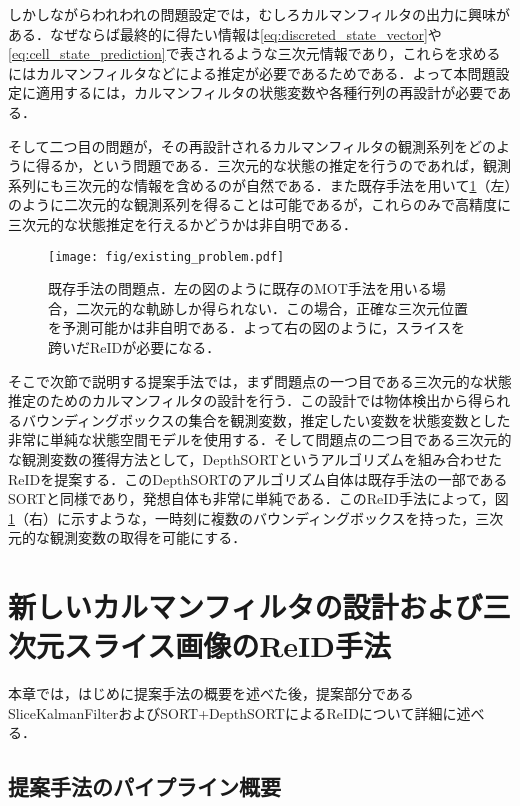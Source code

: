    しかしながらわれわれの問題設定では，むしろカルマンフィルタの出力に興味がある．なぜならば最終的に得たい情報は\ref{eq:discreted_state_vector}や\ref{eq:cell_state_prediction}で表されるような三次元情報であり，これらを求めるにはカルマンフィルタなどによる推定が必要であるためである．よって本問題設定に適用するには，カルマンフィルタの状態変数や各種行列の再設計が必要である．

    そして二つ目の問題が，その再設計されるカルマンフィルタの観測系列をどのように得るか，という問題である．三次元的な状態の推定を行うのであれば，観測系列にも三次元的な情報を含めるのが自然である．また既存手法を用いて\ref{fig:existing_problem}（左）のように二次元的な観測系列を得ることは可能であるが，これらのみで高精度に三次元的な状態推定を行えるかどうかは非自明である．

    \begin{figure}[t]
        \centering
        \texttt{[image: fig/existing\_problem.pdf]}
        \caption[既存手法の問題点]{既存手法の問題点．左の図のように既存のMOT手法を用いる場合，二次元的な軌跡しか得られない．この場合，正確な三次元位置を予測可能かは非自明である．よって右の図のように，スライスを跨いだReIDが必要になる．}
        \label{fig:existing_problem}
    \end{figure}

    そこで次節で説明する提案手法では，まず問題点の一つ目である三次元的な状態推定のためのカルマンフィルタの設計を行う．この設計では物体検出から得られるバウンディングボックスの集合を観測変数，推定したい変数を状態変数とした非常に単純な状態空間モデルを使用する．そして問題点の二つ目である三次元的な観測変数の獲得方法として，DepthSORTというアルゴリズムを組み合わせたReIDを提案する．このDepthSORTのアルゴリズム自体は既存手法の一部であるSORTと同様であり，発想自体も非常に単純である．このReID手法によって，図\ref{fig:existing_problem}（右）に示すような，一時刻に複数のバウンディングボックスを持った，三次元的な観測変数の取得を可能にする．

\section{新しいカルマンフィルタの設計および三次元スライス画像のReID手法}
\label{sec:proposed_method}

本章では，はじめに提案手法の概要を述べた後，提案部分であるSliceKalmanFilterおよびSORT+DepthSORTによるReIDについて詳細に述べる．

    \subsection{提案手法のパイプライン概要}
    \label{subsec:proposed_pipeline}

